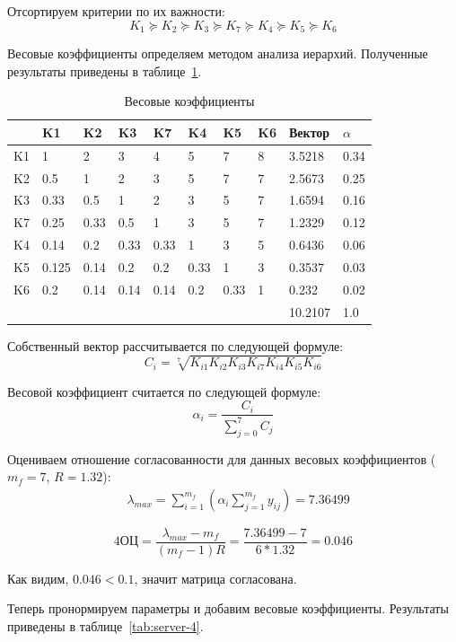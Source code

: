 \documentclass[russian,utf8,emptystyle]{eskdtext}
\begin{document}
Отсортируем критерии по их важности:
$$
K_1 \succeq K_2 \succeq K_3 \succeq K_7 \succeq K_4 \succeq K_5 \succeq K_6
$$

Весовые коэффициенты определяем методом анализа иерархий. Полученные результаты приведены в таблице~\ref{tab:server-3}.

\begin{longtable}{p{1cm}|p{1cm}|p{1cm}|p{1cm}|p{1cm}|p{1cm}|p{1cm}|p{1cm}|p{2cm}|p{2cm}}
\caption{Весовые коэффициенты}
\label{tab:server-3} \\
   & K1    & K2   & K3   & K7   & K4   & K5   & K6 & Вектор & $\alpha$  \\
\hline 
K1 & 1     & 2    & 3    & 4    & 5    & 7    & 8  & 3.5218 & 0.34      \\ 
K2 & 0.5   & 1    & 2    & 3    & 5    & 7    & 7  & 2.5673 & 0.25      \\ 
K3 & 0.33  & 0.5  & 1    & 2    & 3    & 5    & 7  & 1.6594 & 0.16      \\ 
K7 & 0.25  & 0.33 & 0.5  & 1    & 3    & 5    & 7  & 1.2329 & 0.12      \\ 
K4 & 0.14  & 0.2  & 0.33 & 0.33 & 1    & 3    & 5  & 0.6436 & 0.06      \\ 
K5 & 0.125 & 0.14 & 0.2  & 0.2  & 0.33 & 1    & 3  & 0.3537 & 0.03      \\ 
K6 & 0.2   & 0.14 & 0.14 & 0.14 & 0.2  & 0.33 & 1  & 0.232  & 0.02      \\ 
\hline
   &       &      &      &      &      &      &    & 10.2107& 1.0
\end{longtable}

Собственный вектор рассчитывается по следующей формуле:
$$
C_i = \sqrt[7]{K_{i1} K_{i2} K_{i3} K_{i7} K_{i4} K_{i5} K_{i6}}
$$

Весовой коэффициент считается по следующей формуле:
$$
\alpha_i = \frac{C_i}{\sum_{j=0}^{7} C_j}
$$

Оцениваем отношение согласованности для данных весовых коэффициентов ($m_f=7$, $R=1.32$):
\begin{align*}
&\lambda_{max} = \sum_{i=1}^{m_f}(\alpha_i \sum_{j=1}^{m_f} y_{ij}) = 7.36499
\end{align*}

$$4
\text{ОЦ} = \frac{\lambda_{max} - m_f}{(m_f - 1)R} = \frac{7.36499 - 7}{6*1.32} = 0.046
$$

Как видим, $0.046 < 0.1$, значит матрица согласована.

Теперь пронормируем параметры и добавим весовые коэффициенты. Результаты приведены в таблице~\ref{tab:server-4}.
\end{document}
